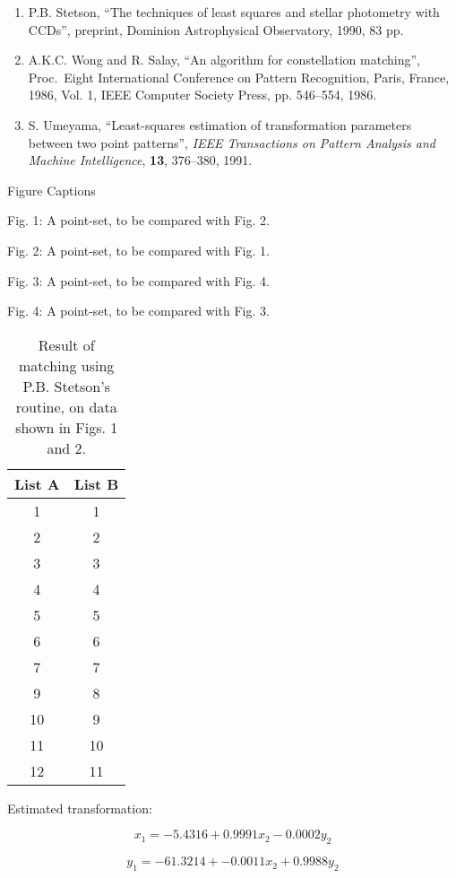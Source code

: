 \begin{enumerate}
\item P.B. Stetson, ``The techniques of least squares and stellar 
photometry with CCDs'', preprint, Dominion Astrophysical Observatory,
1990, 83 pp.

\item A.K.C. Wong and R. Salay, ``An algorithm for constellation matching'',
Proc.\ Eight International Conference on Pattern Recognition, Paris, France,
1986, Vol. 1, IEEE Computer Society Press, pp. 546--554, 1986.

\item S. Umeyama, ``Least-squares estimation of transformation parameters
between two point patterns'', {\it IEEE Transactions on Pattern Analysis
and Machine Intelligence}, {\bf 13}, 376--380, 1991.

\end{enumerate}

\newpage 
Figure Captions

\bigskip

\bigskip

\bigskip

Fig. 1: A point-set, to be compared with Fig. 2.

\bigskip

Fig. 2: A point-set, to be compared with Fig. 1.

\bigskip

Fig. 3: A point-set, to be compared with Fig. 4.

\bigskip

Fig. 4: A point-set, to be compared with Fig. 3.

\newpage

\begin{table}
\begin{center}

\begin{tabular}{c c} 
List A  & List B \\ \hline
1  &  1 \\
2  &  2 \\
3  &  3 \\
4  & 4 \\
5 & 5 \\
6 & 6 \\
7 & 7 \\
9 & 8 \\
10 & 9 \\
11 & 10 \\
12 & 11 
\end{tabular}

\medskip

Estimated transformation:

$$ x_1 = -5.4316 + 0.9991 x_2  -0.0002 y_2 $$

$$ y_1 = -61.3214 + -0.0011 x_2 + 0.9988 y_2 $$

\caption{Result of matching using P.B. Stetson's routine, on data shown in 
Figs. 1 and 2.}
\end{center}

\end{table}

